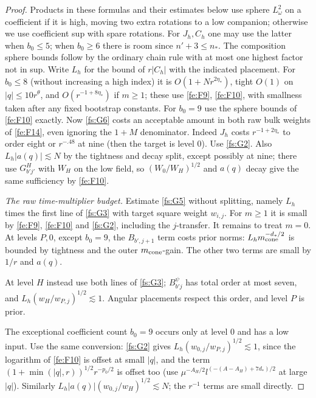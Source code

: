 \begin{proof}
Products in these formulas and their estimates below use sphere \(L^2_\omega\) on a coefficient if it is high, moving two extra rotations to a low companion; otherwise we use coefficient sup with spare rotations. For \(J_h,C_h\) one may use the latter when \(b_0\le5\); when \(b_0\ge6\) there is room since \(n'+3\le n_*\). The composition sphere bounds follow by the ordinary chain rule with at most one highest factor not in sup. Write \(L_h\) for the bound of \(r|C_h|\) with the indicated placement. For \(b_0\le8\) (without increasing a high index) it is \(O(1+N r^{2\eta_*})\), tight \(O(1)\) on \(|q|\le 10r^\theta\), and \(O(r^{-1+8\eta_*})\) if \(m\ge1\); these use \eqref{fe:F9}, \eqref{fe:F10}, with smallness taken after any fixed bootstrap constants. For \(b_0=9\) use the sphere bounds of \eqref{fe:F10} exactly. Now \eqref{fs:G6} costs an acceptable amount in both raw bulk weights of \eqref{fe:F14}, even ignoring the \(1+M\) denominator. Indeed \(J_h\) costs \(r^{-1+2\eta_*}\) to order eight or \(r^{-.48}\) at nine (then the target is level 0). Use \eqref{fs:G2}. Also \(L_h |a(q)|\lesssim N\) by the tightness and decay split, except possibly at nine; there use \(G^H_{b'j'}\) with \(W_H\) on the low field, so \((W_0/W_H)^{1/2}\) and \(a(q)\) decay give the same sufficiency by \eqref{fe:F10}.

\smallskip\noindent\emph{The raw time-multiplier budget.}
Estimate \eqref{fs:G5} without splitting, namely \(L_h\) times the first line of \eqref{fs:G3} with target square weight \(w_{i,j}\). For \(m\ge1\) it is small by \eqref{fe:F9}, \eqref{fe:F10} and \eqref{fs:G2}, including the \(j\)-transfer. It remains to treat \(m=0\).
At levels \(P,0\), except \(b_0=9\), the \(B_{b',j+1}\) term costs prior norms: \(L_h m_{\rm cone}^{-d_*/2}\) is bounded by tightness and the outer \(m_{\rm cone}\)-gain. The other two terms are small by \(1/r\) and \(a(q)\). 

At level \(H\) instead use both lines of \eqref{fs:G3}; \(B^\psi_{b'j}\) has total order at most seven, and \(L_h(w_H/w_{P,j})^{1/2}\lesssim1\). Angular placements respect this order, and level \(P\) is prior. 

The exceptional coefficient count \(b_0=9\) occurs only at level 0
and has a low input.  Use the same conversion: \eqref{fs:G2} gives \(L_h(w_{0,j}/w_{P,j})^{1/2}\lesssim1\), since the logarithm of \eqref{fe:F10} is offset at small \(|q|\), and the term \((1+\min(|q|,r))^{1/2}r^{-p_0/2}\) is offset too (use \(\mu^{-A_H/2}l^{(-(A-A_H)+7d_*)/2}\) at large \(|q|\)). Similarly \(L_h|a(q)|(w_{0,j}/w_H)^{1/2}\lesssim N\); the \(r^{-1}\) terms are small directly.


\end{proof}
